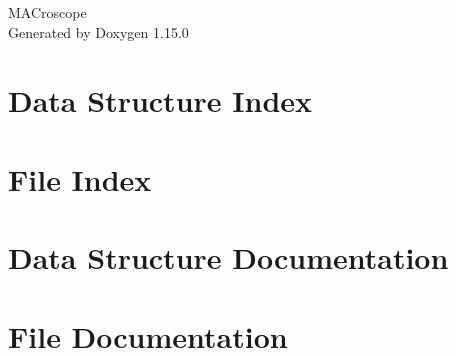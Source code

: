 \documentclass[twoside]{book}
\newcommand{\+}{\discretionary{\mbox{\scriptsize$\hookleftarrow$}}{}{}}
\newcommand{\clearemptydoublepage}{%
    \newpage{\pagestyle{empty}\cleardoublepage}%
  }
\begin{document}
  \raggedbottom
    \hypersetup{pageanchor=false,
                bookmarksnumbered=true,
                pdfencoding=unicode
               }
  \begin{titlepage}
  \vspace*{7cm}
  \begin{center}%
  {\Large MACroscope}\\
  \vspace*{1cm}
  {\large Generated by Doxygen 1.15.0}\\
  \end{center}
  \end{titlepage}
  \clearemptydoublepage
  \tableofcontents
  \clearemptydoublepage
  \hypersetup{pageanchor=true}

\chapter{Data Structure Index}

\chapter{File Index}

\chapter{Data Structure Documentation}







\chapter{File Documentation}










  \backmatter
  \newpage
  \clearemptydoublepage
  \printindex
\end{document}

